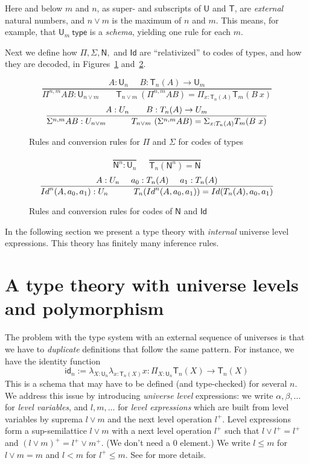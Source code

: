 \documentclass[a4paper,UKenglish,cleveref, autoref, thm-restate]{lipics-v2021}
\newcommand{\Id}{\mathsf{Id}}
\newcommand{\id}{\mathsf{id}}
\newcommand{\NN}{\mathsf{N}}
\newcommand{\UU}{\mathsf{U}}
\newcommand{\type}{\mathsf{type}}
\newcommand{\mylam}[3]{\lambda_{#1:#2}#3}
\newcommand{\mypi}[3]{\Pi_{#1:#2}#3}
\newcommand{\mysig}[3]{\Sigma_{#1:#2}#3}
\newcommand{\sapp}[2]{{#1(#2)}} %
\newcommand{\Idapp}[3]{\sapp{\Id}{#1,#2,#3}}
\newcommand{\Idnapp}[4]{\sapp{\Id^#4}{#1,#2,#3}}
\newcommand{\T}{\mathsf{T}}
\begin{document}
Here and below $m$ and $n$, as super- and subscripts of $\UU$ and $\T$,
are \emph{external} natural numbers, and $n \vee m$ is the
maximum of $n$ and $m$. This means, for example, that $\UU_m~\type$ is
a \emph{schema}, yielding one rule for each $m$.

Next we define how $\Pi, \Sigma, \NN,$ and $\Id$ are ``relativized'' to
codes of types, and how they are decoded, in Figures~\ref{fig:PiSigU} and~\ref{fig:NIdU}.

\begin{figure}[h!]
$$
\frac{A:\UU_{n}~~~~~~B:\T_{n}(A)\rightarrow \UU_{m}}
     {\Pi^{n,m} A B:\UU_{n\vee m}~~~~~~~~~
      \T_{n\vee m}~(\Pi^{n,m} A B) = \mypi{x}{\T_{n}(A)}{ \T_{m}(B~x)}}
$$
$$
\frac{A:\UU_{n}~~~~~~B:\T_{n}(A)\rightarrow \UU_{m}}
     {\Sigma^{n,m} A B:\UU_{n\vee m}~~~~~~~~~
     \T_{n\vee m}~(\Sigma^{n,m} A B) = \mysig {x}{\T_{n}(A)}{ \T_{m}(B~x)}}
\belowdisplayshortskip -1pt
$$
  \caption{Rules and conversion rules for $\Pi$ and $\Sigma$ for codes of types}\label{fig:PiSigU}
\end{figure}

\begin{figure}[h!]
$$
\frac{}{\NN^{n}:\UU_{n}}~~~~~~\frac{}{\T_{n}(\NN^{n}) = \NN}
$$
$$
\frac{A:\UU_n~~~~a_0:\T_n(A)~~~~a_1:\T_n(A)}
{\Idnapp{A}{a_0}{a_1}{n}:\UU_n ~~~~~~~~~ \T_n(\Idnapp{A}{a_0}{a_1}{n}) = \Idapp{{\T_n(A)}}{a_0}{a_1} }
\belowdisplayshortskip 1pt
$$
\caption{Rules and conversion rules for codes of $\NN$ and $\Id$}\label{fig:NIdU}
\end{figure}

In the following section we present a type theory with \emph{internal}
universe level expressions. This theory has finitely many inference rules.

 \section{A type theory with universe levels and polymorphism }\label{sec:internal}

The problem with the type system with an external sequence of universes
is that we have to \emph{duplicate} definitions that follow
the same pattern. For instance, we have the identity function
$$
\id_n := \mylam{X}{\UU_n}{\mylam{x}{\T_n(X)}{x}} : \mypi{X}{\UU_n}{\T_n(X)\rightarrow \T_n(X)}
$$
This is a schema that
may have to be defined (and type-checked) for several $n$.
We address this issue by introducing \emph{universe level}
expressions: we write $\alpha,\beta,\dots$
for \emph{level variables}, and $l,m,\dots$ for
\emph{level expressions} which are built from level variables
by suprema $l \vee m$ and the next level operation $l^+$.
Level expressions form a sup-semilattice $l\vee m$
with a next level operation $l^+$ such that $l \vee l^+ = l^+$
and $(l\vee m)^+ = l^+\vee m^+$. (We don't need a $0$ element.)
We write $l\leqslant m$ for $l\vee m = m$ and $l<m$ for $l^+\leqslant m$.
See \cite{bezem-coquand:lattices} for more details.
\end{document}
